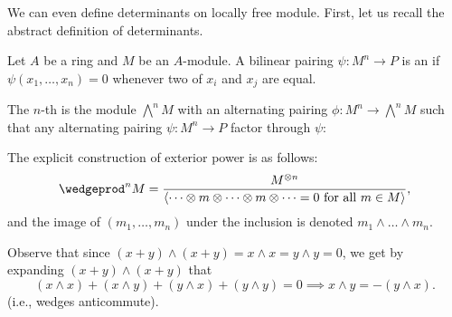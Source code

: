 We can even define determinants on locally free module.
First, let us recall the abstract definition of determinants.
\begin{definition}
    Let $A$ be a ring and $M$ be an $A$-module.
    A bilinear pairing $\psi :M^n \to P$
    is an  if $\psi(x_1,\dots,x_n)=0$
    whenever two of $x_i$ and $x_j$ are equal.
    
    The $n$-th  is
    the module $\bigwedge^n M$ with an alternating pairing
    $\phi : M^n \to \bigwedge^n M$ such that
    any alternating pairing $\psi : M^n\to P$
    factor through $\psi$:
    \begin{center}
    \end{center}
\end{definition}
The explicit construction of exterior power is as follows:
$$\wedgeprod^n M = \frac{M^{\otimes n}}{\langle 
\dots \otimes m \otimes \dots\otimes m\otimes \dots= 0
\text{ for all }m\in M
\rangle},$$
and the image of $(m_1,\dots,m_n)$ under the inclusion
is denoted $m_1\wedge \dots \wedge m_n$.

Observe that since $(x+y)\wedge (x+y)=x\wedge x
= y\wedge y =0$, we get by expanding 
$(x+y)\wedge (x+y)$ that
$$(x\wedge x) + (x\wedge y) + (y\wedge x) + (y\wedge y)
= 0 \implies x\wedge y = -(y\wedge x).$$
(i.e., wedges anticommute).

